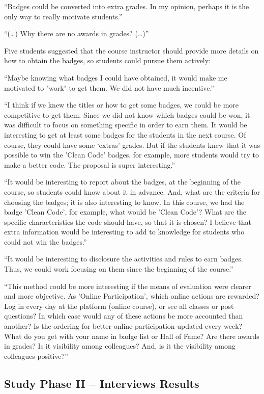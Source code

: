 “Badges could be converted into extra grades. In my opinion, perhaps it is the only way to really motivate students.”

“(…) Why there are no awards in grades? (…)”

Five students suggested that the course instructor should provide more details on how to obtain the badges, so students could pursue them actively:

“Maybe knowing what badges I could have obtained, it would make me motivated to "work" to get them. We did not have much incentive.”

 “I think if we knew the titles or how to get some badges, we could be more competitive to get them. Since we did not know which badges could be won, it was difficult to focus on something specific in order to earn them. It would be interesting to get at least some badges for the students in the next course. Of course, they could have some ‘extras’ grades. But if the students knew that it was possible to win the 'Clean Code' badges, for example, more students would try to make a better code. The proposal is super interesting.”

“It would be interesting to report about the badges, at the beginning of the course, so students could know about it in advance. And, what are the criteria for choosing the badges; it is also interesting to know. In this course, we had the badge 'Clean Code', for example, what would be 'Clean Code'? What are the specific characteristics the code should have, so that it is chosen? I believe that extra information would be interesting to add to knowledge for students who could not win the badges.”

“It would be interesting to disclosure the activities and rules to earn badges. Thus, we could work focusing on them since the beginning of the course.”

 “This method could be more interesting if the means of evaluation were clearer and more objective. As 'Online Participation', which online actions are rewarded? Log in every day at the platform (online course), or see all classes or post questions? In which case would any of these actions be more accounted than another? Is the ordering for better online participation updated every week? What do you get with your name in badge list or Hall of Fame? Are there awards in grades? Is it visibility among colleagues? And, is it the visibility among colleagues positive?”

\subsection{Study Phase II – Interviews Results}

